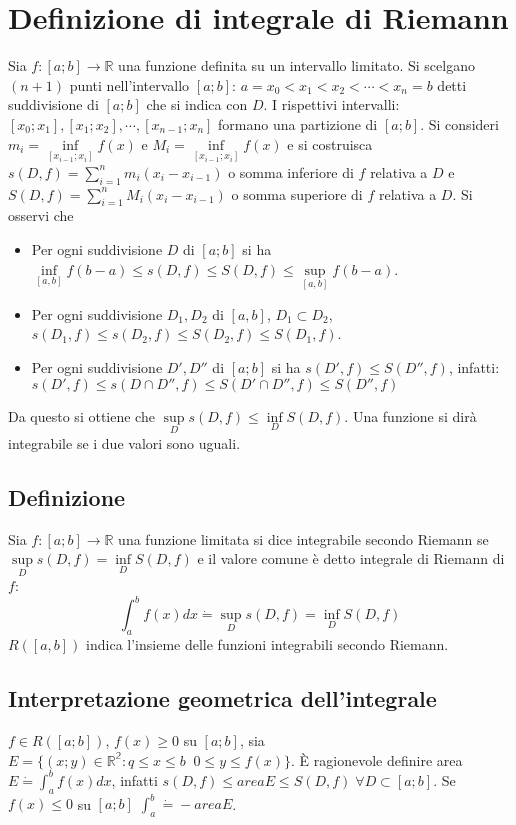 \section{Definizione di integrale di Riemann}
Sia $f:[a;b]\rightarrow\mathbb{R}$ una funzione definita su un intervallo limitato. Si scelgano $(n+1)$ punti nell'intervallo $[a;b]$: $a=x_0<x_1<x_2<\cdots<x_n=b$ detti 
suddivisione di $[a;b]$ che si indica con $D$. I rispettivi intervalli: $[x_0;x_1],[x_1;x_2],\cdots,[x_{n-1};x_n]$ formano una partizione di $[a;b]$. Si consideri $m_i=\inf
\limits_{[x_{i-1};x_i]}f(x)$ e $M_i=\inf\limits_{[x_{i-1};x_i]}f(x)$ e si costruisca $s(D,f)=\sum\limits_{i=1}^n m_i(x_i-x_{i-1})$ o somma inferiore di $f$ relativa a $D$ e
$S(D,f)=\sum\limits_{i=1}^n M_i(x_i-x_{i-1})$ o somma superiore di $f$ relativa a $D$. Si osservi che 
\begin{itemize}
\item Per ogni suddivisione $D$ di $[a;b]$ si ha $\inf\limits_{[a,b]}f(b-a)\le s(D,f)\le S(D,f)\le \sup\limits_{[a,b]}f(b-a)$.
\item Per ogni suddivisione $D_1,D_2$ di $[a,b]$, $D_1\subset D_2$, $s(D_1,f)\le s(D_2,f)\le S(D_2,f)\le S(D_1,f)$.
\item Per ogni suddivisione $D',D''$ di $[a;b]$ si ha $s(D',f)\le S(D'', f)$, infatti: $s(D',f)\le s(D\cap D'',f)\le S(D'\cap D'',f)\le S(D'',f)$
\end{itemize}
Da questo si ottiene che $\sup\limits_D s(D,f)\le \inf\limits_D S(D,f)$. Una funzione si dir\`a  integrabile se i due valori sono uguali.
\subsection{Definizione}
Sia $f:[a;b]\rightarrow\mathbb{R}$ una funzione limitata si dice integrabile secondo Riemann se $\sup\limits_D s(D,f)=\inf\limits_D S(D,f)$ e il valore comune \`e detto integrale 
di Riemann di $f$:
\begin{equation}
\int_a^bf(x)dx\dot{=}\sup\limits_D s(D,f)= \inf\limits_D S(D,f)
\end{equation} 
$R([a,b])$ indica l'insieme delle funzioni integrabili secondo Riemann.
\subsection{Interpretazione geometrica dell'integrale}
$f\in R([a;b])$, $f(x)\ge 0$ su $[a;b]$, sia $E=\{(x;y)\in\mathbb{R^2}:q\le x\le b\;\;0\le y\le f(x)\}$. \`E ragionevole definire area $E\dot{=}\int_a^bf(x)dx$, infatti $s(D,f)
\le areaE\le S(D,f)\;\forall D\subset[a;b]$. Se $f(x)\le 0$ su $[a;b]$ $\int_a^b\dot{=}-areaE$.
